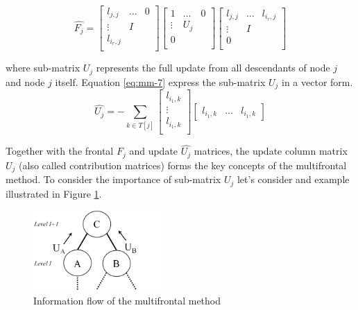 \begin{equation} \label{eq:mm-6}
\hat{F_{j}} = \begin{bmatrix}
l_{j,j} & \dots & 0 \\
\vdots & I \\
l_{i_{r},j} \\
\end{bmatrix} 
\begin{bmatrix}
1 & \dots & 0 \\
\vdots & U_{j} \\
0 \\
\end{bmatrix} 
\begin{bmatrix}
l_{j,j} & \dots & l_{i_{r},j} \\
\vdots & I \\
0 \\
\end{bmatrix} 
\end{equation}

where sub-matrix $U_{j}$ represents the full update from all descendants of node $j$ and node $j$ itself. Equation \ref{eq:mm-7} express the sub-matrix $U_{j}$ in a vector form.\\

\begin{equation} \label{eq:mm-7}
\hat{U_{j}} = - \sum_{k \in T[j]}  \begin{bmatrix}
l_{i_1,k} \\
\vdots \\
l_{i_1,k} \\
\end{bmatrix} \begin{bmatrix}
l_{i_1,k} & \dots & l_{i_1,k}
\end{bmatrix}
\end{equation}

Together with the frontal $F_{j}$ and update $\hat{U_j}$ matrices, the update column matrix $U_{j}$ (also called contribution matrices) forms the key concepts of the multifrontal method. To consider the importance of sub-matrix $U_{j}$ let's consider and example illustrated in Figure \ref{fig:information-float}.\\

\figpointer{\ref{fig:information-float}}
\begin{figure}[htpb]
  \centering
  \includegraphics[width=0.45\textwidth]{figures/chapter-2/information-flow.png}
\caption{Information flow of the multifrontal method}
\label{fig:information-float}
\end{figure}


